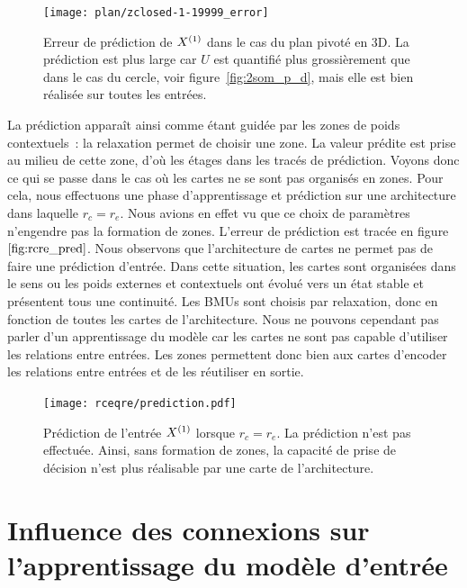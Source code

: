 \documentclass[../main]{subfiles}
\begin{document}
\begin{figure}
	\texttt{[image: plan/zclosed-1-19999\_error]}	
	\caption{Erreur de prédiction de $X^{({1})}$ dans le cas du plan pivoté en 3D. La prédiction est plus large car $U$ est quantifié plus grossièrement que dans le cas du cercle, voir figure~\ref{fig:2som_p_d}, mais elle est bien réalisée sur toutes les entrées. \label{fig:plan3_pred}}
\end{figure}
La prédiction apparaît ainsi comme étant guidée par les zones de poids contextuels~: la relaxation permet de choisir une zone. La valeur prédite est prise au milieu de cette zone, d'où les \og étages \fg{} dans les tracés de prédiction.
Voyons donc ce qui se passe dans le cas où les cartes ne se sont pas organisés en zones.
Pour cela, nous effectuons une phase d'apprentissage et prédiction sur une architecture dans laquelle $r_c = r_e$. 
Nous avions en effet vu que ce choix de paramètres n'engendre pas la formation de zones. L'erreur de prédiction est tracée en figure $\ref{fig:rcre_pred}$.
Nous observons que l'architecture de cartes ne permet pas de faire une prédiction d'entrée.
Dans cette situation, les cartes sont \og organisées \fg{} dans le sens ou les poids externes et contextuels ont évolué vers un état stable et présentent tous une continuité. Les BMUs sont choisis par relaxation, donc en fonction de toutes les cartes de l'architecture. Nous ne pouvons cependant pas parler d'un apprentissage du modèle car les cartes ne sont pas capable d'utiliser les relations entre entrées.
Les zones permettent donc bien aux cartes d'encoder les relations entre entrées et de les réutiliser en sortie.

\begin{figure}
	\centering\texttt{[image: rceqre/prediction.pdf]}
	\caption{Prédiction de l'entrée $X^{({1})}$ lorsque $r_c = r_e$. La prédiction n'est pas effectuée. Ainsi, sans formation de zones, la capacité de prise de décision n'est plus réalisable par une carte de l'architecture. \label{fig:rcre_pred}}
\end{figure}
	

\section{Influence des connexions sur l'apprentissage du modèle d'entrée}
\end{document}
